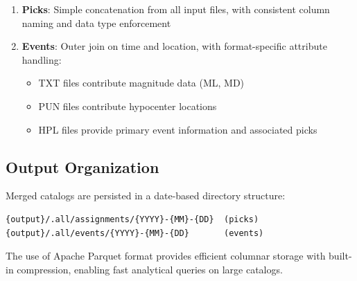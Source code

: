 \begin{enumerate}
  \item \textbf{Picks}: Simple concatenation from all input files, with
    consistent column naming and data type enforcement

  \item \textbf{Events}: Outer join on time and location, with format-specific
    attribute handling:
    \begin{itemize}
      \item TXT files contribute magnitude data (ML, MD)
      \item PUN files contribute hypocenter locations
      \item HPL files provide primary event information and associated picks
    \end{itemize}
\end{enumerate}

\subsection{Output Organization}
Merged catalogs are persisted in a date-based directory structure:

\begin{verbatim}
{output}/.all/assignments/{YYYY}-{MM}-{DD}  (picks)
{output}/.all/events/{YYYY}-{MM}-{DD}       (events)
\end{verbatim}

The use of Apache Parquet format provides efficient columnar storage with
built-in compression, enabling fast analytical queries on large catalogs.

